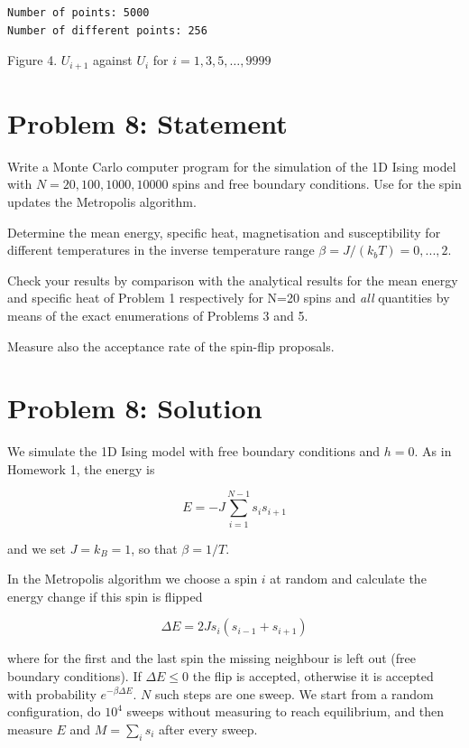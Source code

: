 \documentclass[11pt]{article}
\begin{document}
    \begin{Verbatim}[commandchars=\\\{\}]
Number of points: 5000
Number of different points: 256
    \end{Verbatim}

    Figure 4. \(U_{i+1}\) against \(U_i\) for \(i=1,3,5,\dots,9999\)

    \section*{Problem 8: Statement}\label{problem-8-statement}

Write a Monte Carlo computer program for the simulation of the 1D Ising
model with \(N = 20, 100, 1000, 10000\) spins and free boundary
conditions. Use for the spin updates the Metropolis algorithm.

Determine the mean energy, specific heat, magnetisation and
susceptibility for different temperatures in the inverse temperature
range \(\beta=J/(k_bT) =0,...,2.\)

Check your results by comparison with the analytical results for the
mean energy and specific heat of Problem 1 respectively for N=20 spins
and \emph{all} quantities by means of the exact enumerations of Problems
3 and 5.

Measure also the acceptance rate of the spin-flip proposals.

    \section*{Problem 8: Solution}\label{problem-8-solution}

    We simulate the 1D Ising model with free boundary conditions and
\(h=0\). As in Homework 1, the energy is

\[
E=-J\sum_{i=1}^{N-1}s_is_{i+1} \tag{7}
\]

and we set \(J=k_B=1\), so that \(\beta=1/T\).

In the Metropolis algorithm we choose a spin \(i\) at random and
calculate the energy change if this spin is flipped

\[
\Delta E=2Js_i(s_{i-1}+s_{i+1}) \tag{8}
\]

where for the first and the last spin the missing neighbour is left out
(free boundary conditions). If \(\Delta E\le0\) the flip is accepted,
otherwise it is accepted with probability \(e^{-\beta\Delta E}\). \(N\)
such steps are one sweep. We start from a random configuration, do
\(10^4\) sweeps without measuring to reach equilibrium, and then measure
\(E\) and \(M=\sum_i s_i\) after every sweep.
\end{document}
